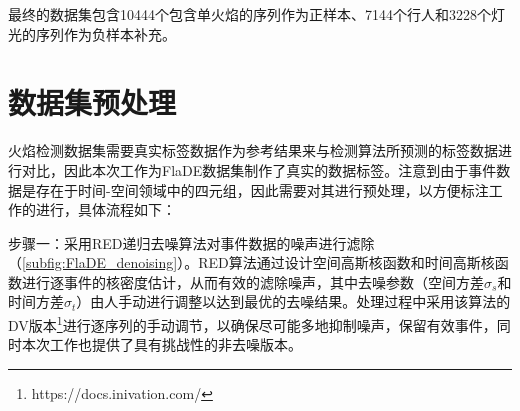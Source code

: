 最终的数据集包含10444个包含单火焰的序列作为正样本、7144个行人和3228个灯光的序列作为负样本补充。

\section{数据集预处理}
火焰检测数据集需要真实标签数据作为参考结果来与检测算法所预测的标签数据进行对比，因此本次工作为FlaDE数据集制作了真实的数据标签。注意到由于事件数据是存在于时间-空间领域中的四元组，因此需要对其进行预处理，以方便标注工作的进行，具体流程如下：

步骤一：采用RED递归去噪算法\cite{ding2023}对事件数据的噪声进行滤除（\ref{subfig:FlaDE_denoising}）。RED算法通过设计空间高斯核函数和时间高斯核函数进行逐事件的核密度估计，从而有效的滤除噪声，其中去噪参数（空间方差$\sigma_s$和时间方差$\sigma_t$）由人手动进行调整以达到最优的去噪结果。处理过程中采用该算法的DV版本\footnote{https://docs.inivation.com/}进行逐序列的手动调节，以确保尽可能多地抑制噪声，保留有效事件，同时本次工作也提供了具有挑战性的非去噪版本。

